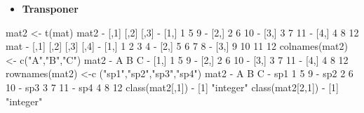 \documentclass[
]{book}
\newenvironment{Shaded}{\begin{snugshade}}{\end{snugshade}}
\newcommand{\DecValTok}[1]{\textcolor[rgb]{0.00,0.00,0.81}{#1}}
\newcommand{\FunctionTok}[1]{\textcolor[rgb]{0.00,0.00,0.00}{#1}}
\newcommand{\NormalTok}[1]{#1}
\newcommand{\OtherTok}[1]{\textcolor[rgb]{0.56,0.35,0.01}{#1}}
\newcommand{\SpecialCharTok}[1]{\textcolor[rgb]{0.00,0.00,0.00}{#1}}
\newcommand{\StringTok}[1]{\textcolor[rgb]{0.31,0.60,0.02}{#1}}
\providecommand{\tightlist}{%
  \setlength{\itemsep}{0pt}\setlength{\parskip}{0pt}}
\begin{document}
\begin{itemize}
\tightlist
\item
  \textbf{Transponer}
\end{itemize}

\begin{Shaded}
\begin{Highlighting}[]
\NormalTok{mat2 }\OtherTok{\textless{}{-}} \FunctionTok{t}\NormalTok{(mat)}
\NormalTok{mat2}
\SpecialCharTok{{-}}\NormalTok{      [,}\DecValTok{1}\NormalTok{] [,}\DecValTok{2}\NormalTok{] [,}\DecValTok{3}\NormalTok{]}
\SpecialCharTok{{-}}\NormalTok{ [}\DecValTok{1}\NormalTok{,]    }\DecValTok{1}    \DecValTok{5}    \DecValTok{9}
\SpecialCharTok{{-}}\NormalTok{ [}\DecValTok{2}\NormalTok{,]    }\DecValTok{2}    \DecValTok{6}   \DecValTok{10}
\SpecialCharTok{{-}}\NormalTok{ [}\DecValTok{3}\NormalTok{,]    }\DecValTok{3}    \DecValTok{7}   \DecValTok{11}
\SpecialCharTok{{-}}\NormalTok{ [}\DecValTok{4}\NormalTok{,]    }\DecValTok{4}    \DecValTok{8}   \DecValTok{12}
\NormalTok{mat}
\SpecialCharTok{{-}}\NormalTok{      [,}\DecValTok{1}\NormalTok{] [,}\DecValTok{2}\NormalTok{] [,}\DecValTok{3}\NormalTok{] [,}\DecValTok{4}\NormalTok{]}
\SpecialCharTok{{-}}\NormalTok{ [}\DecValTok{1}\NormalTok{,]    }\DecValTok{1}    \DecValTok{2}    \DecValTok{3}    \DecValTok{4}
\SpecialCharTok{{-}}\NormalTok{ [}\DecValTok{2}\NormalTok{,]    }\DecValTok{5}    \DecValTok{6}    \DecValTok{7}    \DecValTok{8}
\SpecialCharTok{{-}}\NormalTok{ [}\DecValTok{3}\NormalTok{,]    }\DecValTok{9}   \DecValTok{10}   \DecValTok{11}   \DecValTok{12}
\FunctionTok{colnames}\NormalTok{(mat2) }\OtherTok{\textless{}{-}} \FunctionTok{c}\NormalTok{(}\StringTok{"A"}\NormalTok{,}\StringTok{"B"}\NormalTok{,}\StringTok{"C"}\NormalTok{)}
\NormalTok{mat2}
\SpecialCharTok{{-}}\NormalTok{      A B  C}
\SpecialCharTok{{-}}\NormalTok{ [}\DecValTok{1}\NormalTok{,] }\DecValTok{1} \DecValTok{5}  \DecValTok{9}
\SpecialCharTok{{-}}\NormalTok{ [}\DecValTok{2}\NormalTok{,] }\DecValTok{2} \DecValTok{6} \DecValTok{10}
\SpecialCharTok{{-}}\NormalTok{ [}\DecValTok{3}\NormalTok{,] }\DecValTok{3} \DecValTok{7} \DecValTok{11}
\SpecialCharTok{{-}}\NormalTok{ [}\DecValTok{4}\NormalTok{,] }\DecValTok{4} \DecValTok{8} \DecValTok{12}
\FunctionTok{rownames}\NormalTok{(mat2) }\OtherTok{\textless{}{-}}\FunctionTok{c}\NormalTok{ (}\StringTok{"sp1"}\NormalTok{,}\StringTok{"sp2"}\NormalTok{,}\StringTok{"sp3"}\NormalTok{,}\StringTok{"sp4"}\NormalTok{)}
\NormalTok{mat2}
\SpecialCharTok{{-}}\NormalTok{     A B  C}
\SpecialCharTok{{-}}\NormalTok{ sp1 }\DecValTok{1} \DecValTok{5}  \DecValTok{9}
\SpecialCharTok{{-}}\NormalTok{ sp2 }\DecValTok{2} \DecValTok{6} \DecValTok{10}
\SpecialCharTok{{-}}\NormalTok{ sp3 }\DecValTok{3} \DecValTok{7} \DecValTok{11}
\SpecialCharTok{{-}}\NormalTok{ sp4 }\DecValTok{4} \DecValTok{8} \DecValTok{12}
\FunctionTok{class}\NormalTok{(mat2[,}\DecValTok{1}\NormalTok{])}
\SpecialCharTok{{-}}\NormalTok{ [}\DecValTok{1}\NormalTok{] }\StringTok{"integer"}
\FunctionTok{class}\NormalTok{(mat2[}\DecValTok{2}\NormalTok{,}\DecValTok{1}\NormalTok{])}
\SpecialCharTok{{-}}\NormalTok{ [}\DecValTok{1}\NormalTok{] }\StringTok{"integer"}
\end{Highlighting}
\end{Shaded}
\end{document}
